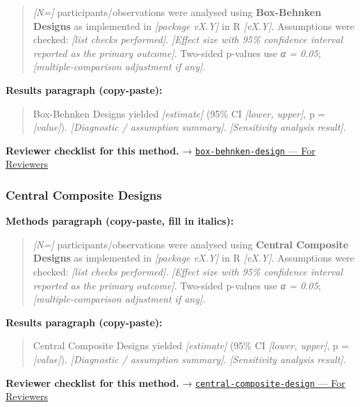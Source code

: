 \documentclass[
]{article}
\begin{document}
\begin{quote}
\emph{{[}N={]}} participants/observations were analysed using
\textbf{Box-Behnken Designs} as implemented in \emph{{[}package vX.Y{]}}
in R \emph{{[}vX.Y{]}}. Assumptions were checked: \emph{{[}list checks
performed{]}}. \emph{{[}Effect size with 95\% confidence interval
reported as the primary outcome{]}}. Two-sided p-values use \emph{α =
0.05}; \emph{{[}multiple-comparison adjustment if any{]}}.
\end{quote}

\textbf{Results paragraph (copy-paste):}

\begin{quote}
Box-Behnken Designs yielded \emph{{[}estimate{]}} (95\% CI
\emph{{[}lower, upper{]}}, p = \emph{{[}value{]}}). \emph{{[}Diagnostic
/ assumption summary{]}}. \emph{{[}Sensitivity analysis result{]}}.
\end{quote}

\textbf{Reviewer checklist for this method.} →
\href{../chapters/16-design/box-behnken-design.Rmd\#for-reviewers}{\texttt{box-behnken-design}
--- For Reviewers}

\subsubsection{Central Composite
Designs}\label{central-composite-designs}

\textbf{Methods paragraph (copy-paste, fill in italics):}

\begin{quote}
\emph{{[}N={]}} participants/observations were analysed using
\textbf{Central Composite Designs} as implemented in \emph{{[}package
vX.Y{]}} in R \emph{{[}vX.Y{]}}. Assumptions were checked: \emph{{[}list
checks performed{]}}. \emph{{[}Effect size with 95\% confidence interval
reported as the primary outcome{]}}. Two-sided p-values use \emph{α =
0.05}; \emph{{[}multiple-comparison adjustment if any{]}}.
\end{quote}

\textbf{Results paragraph (copy-paste):}

\begin{quote}
Central Composite Designs yielded \emph{{[}estimate{]}} (95\% CI
\emph{{[}lower, upper{]}}, p = \emph{{[}value{]}}). \emph{{[}Diagnostic
/ assumption summary{]}}. \emph{{[}Sensitivity analysis result{]}}.
\end{quote}

\textbf{Reviewer checklist for this method.} →
\href{../chapters/16-design/central-composite-design.Rmd\#for-reviewers}{\texttt{central-composite-design}
--- For Reviewers}
\end{document}
